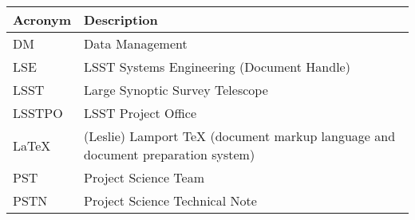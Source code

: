 \addtocounter{table}{-1}
\begin{longtable}{p{}p{}}\hline
\textbf{Acronym} & \textbf{Description}  \\\hline

DM & Data Management \\\hline
LSE & LSST Systems Engineering (Document Handle) \\\hline
LSST & Large Synoptic Survey Telescope \\\hline
LSSTPO & LSST Project Office \\\hline
LaTeX & (Leslie) Lamport TeX (document markup language and document preparation system) \\\hline
PST & Project Science Team \\\hline
PSTN & Project Science Technical Note \\\hline
\end{longtable}
